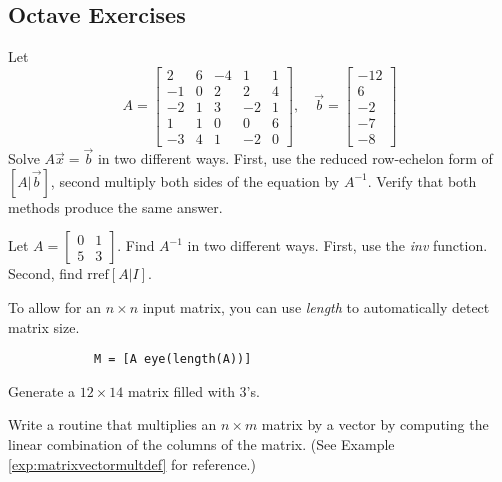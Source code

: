 \documentclass{ximera}
\begin{document}
\subsection*{Octave Exercises}
\begin{problem}\label{prob_oct_mat5}
    Let $$A=\begin{bmatrix}2 & 6 & -4 & 1 & 1\\
-1 & 0 & 2 & 2 & 4\\
-2 & 1 & 3 & -2 & 1\\
1 & 1 & 0 & 0 & 6\\
-3 & 4 & 1 & -2 & 0\end{bmatrix}, \quad \vec{b}=\begin{bmatrix}-12\\
 6\\
 -2\\
 -7\\
 -8\end{bmatrix}$$
Solve $A\vec{x}=\vec{b}$ in two different ways.  First, use the reduced row-echelon form of $[A|\vec{b}]$, second multiply both sides of the equation by $A^{-1}$.  Verify that both methods produce the same answer.
\end{problem}

\begin{problem}\label{prob_oct_mat1}
Let $A=\begin{bmatrix} 0 & 1\\5 & 3\end{bmatrix}$.  Find $A^{-1}$ in two different ways.  First, use the \emph{inv} function.  Second, find $\text{rref}[A|I]$.
    \begin{hint}
        To allow for an $n\times n$ input matrix, you can use \emph{length} to automatically detect matrix size.
        
        \begin{verbatim}
            M = [A eye(length(A))]  
        \end{verbatim}
    \end{hint}
\end{problem}   

\begin{problem}\label{prob_oct_mat4}
    Generate a $12\times 14$ matrix filled with $3$'s.
\end{problem}

\begin{problem}\label{prob_oct_mat2}
Write a routine that multiplies an $n\times m$ matrix by a vector by computing the linear combination of the columns of the matrix. (See Example \ref{exp:matrixvectormultdef} for reference.)  
\end{problem}
\end{document}
